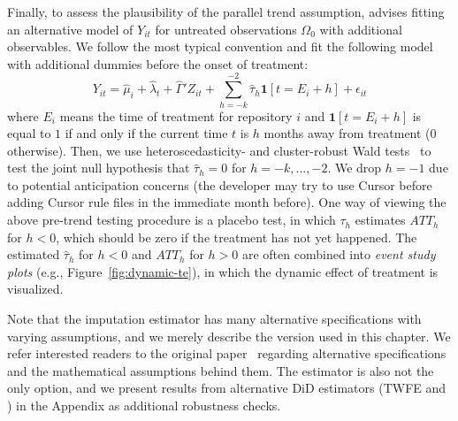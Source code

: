 Finally, to assess the plausibility of the parallel trend assumption, \citet{borusyak2024revisiting} advises fitting an alternative model of $Y_{it}$ for untreated observations $\Omega_0$ with additional observables.
We follow the most typical convention and fit the following model with additional dummies before the onset of treatment:
\begin{equation}
\label{eq:parallel-trend}
    Y_{it}=\hat{\mu}_i + \hat{\lambda}_t + \hat{\Gamma}' Z_{it} + \sum_{h=-k}^{-2}\hat\tau_h\mathbf{1}[t=E_i + h] + \epsilon_{it}
\end{equation}
where $E_i$ means the time of treatment for repository $i$ and $\mathbf{1}[t=E_i+h]$ is equal to $1$ if and only if the current time $t$ is $h$ months away from treatment (0 otherwise).
Then, we use heteroscedasticity- and cluster-robust Wald tests~\cite{borusyak2024revisiting} to test the joint null hypothesis that $\hat\tau_h=0$ for $h=-k,...,-2$.
We drop $h=-1$ due to potential anticipation concerns (the developer may try to use Cursor before adding Cursor rule files in the immediate month before).
One way of viewing the above pre-trend testing procedure is a placebo test, in which $\tau_h$ estimates $ATT_h$ for $h < 0$, which should be zero if the treatment has not yet happened.
The estimated $\hat\tau_h$ for $h<0$ and $ATT_h$ for $h>0$ are often combined into \emph{event study plots} (e.g., Figure~\ref{fig:dynamic-te}), in which the dynamic effect of treatment is visualized.

Note that the \citet{borusyak2024revisiting} imputation estimator has many alternative specifications with varying assumptions, and we merely describe the version used in this chapter.
We refer interested readers to the original paper~\cite{borusyak2024revisiting} regarding alternative specifications and the mathematical assumptions behind them.
The \citet{borusyak2024revisiting} estimator is also not the only option, and we present results from alternative DiD estimators (TWFE and \citet{callaway2021difference}) in the Appendix as additional robustness checks.


